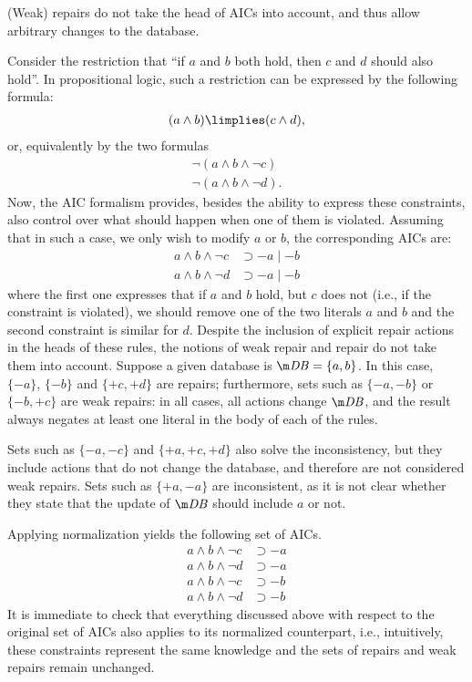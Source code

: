 (Weak) repairs do not take the head of AICs into account, and thus allow arbitrary changes to the database.

\begin{example}
  \label{ex:repairs}
  Consider the restriction that ``if $a$ and $b$ both hold, then $c$ and $d$ should also hold''. 
  In propositional logic, such a restriction can be expressed by the following formula:
  \begin{align*}
   (a \land b) \limplies (c \land d),
  \end{align*}
  or, equivalently by the two formulas 
  \begin{align*}
   \lnot(a \land b\land \neg c)\\
   \lnot(a \land b\land \lnot d).
  \end{align*}
  Now, the AIC formalism provides, besides the ability to express these constraints, also control over what should happen when one of them is violated. 
  Assuming that in such a case, we only wish to modify $a$ or $b$, the corresponding AICs are: 
  \begin{align*}
    a\land b\land\neg c &\supset -a\mid -b\\    
    a\land b\land\neg d &\supset -a\mid -b
  \end{align*}
  where the first one expresses that if $a$ and $b$ hold, but $c$ does not (i.e., if the constraint is violated), we should remove one of the two literals $a$ and $b$ and the second constraint is similar for $d$.
  Despite the inclusion of explicit repair actions in the heads of these rules, the notions of weak repair and repair do not take them into account.
  Suppose a given database is $\db=\{a,b\}$.
  In this case, $\{{-a}\}$, $\{{-b}\}$ and $\{{+c},{+d}\}$ are repairs; furthermore, sets such as $\{{-a},{-b}\}$ or $\{{-b},{+c}\}$ are weak repairs: in all cases, all actions change $\db$, and the result always negates at least one literal in the body of each of the rules.

  Sets such as $\{{-a},{-c}\}$ and $\{{+a},{+c},{+d}\}$ also solve the inconsistency, but they include actions that do not change the database, and therefore are not considered weak repairs.
  Sets such as $\{{+a},{-a}\}$ are inconsistent, as it is not clear whether they state that the update of $\db$ should include $a$ or not.

  Applying normalization yields the following set of AICs.
  \begin{align*}
    a\land b\land\neg c &\supset{-a} \\
    a\land b\land\neg d &\supset{-a} \\
    a\land b\land\neg c &\supset{-b} \\
    a\land b\land\neg d &\supset{-b}
  \end{align*}
  It is immediate to check that everything discussed above with respect to the original set of AICs also applies to its normalized counterpart, i.e., intuitively, these constraints represent the same knowledge and the sets of repairs and weak repairs remain unchanged. 
\end{example}

